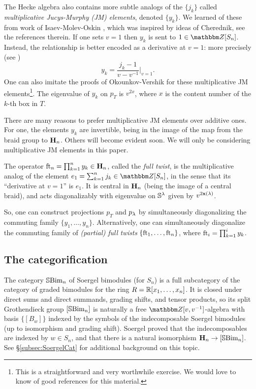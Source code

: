 The Hecke algebra also contains more subtle analogs of the $\{j_k\}$ called \emph{multiplicative Jucys-Murphy (JM) elements}, denoted $\{y_k\}$. We learned of these from work of Isaev-Molev-Oskin \cite{IMO}, which was inspired by ideas of Cherednik, see the references therein. If one sets $v=1$ then $y_k$ is sent to $1 \in \Z[S_n]$. Instead, the relationship is better encoded as a derivative at $v=1$: more precisely (see \cite[p2]{IMO})
\begin{equation} y_k = \frac{j_k - 1}{v - v^{-1}}|_{v = 1}.\end{equation}
One can also imitate the proofs of Okounkov-Vershik \cite{OV96} for these multiplicative JM elements\footnote{This is a straightforward and very worthwhile exercise. We would love to know of good references for this material.}. The eigenvalue of $y_k$ on $p_T$ is $v^{2x}$, where $x$ is the content number of the $k$-th box in $T$.

There are many reasons to prefer multiplicative JM elements over additive ones. For one, the elements $y_k$ are invertible, being in the image of the map from the braid group to ${\mathbf H}_n$. Others will become evident soon. We will only be considering multiplicative JM elements in this paper.

The operator $\operatorname{ft}_n = \prod_{k=1}^n y_k \in {\mathbf H}_n$, called the \emph{full twist}, is the multiplicative analog of the element $e_1 = \sum_{k=1}^n j_k \in \Z[S_n]$, in the sense that its ``derivative at $v=1$'' is $e_1$. It is central in ${\mathbf H}_n$ (being the image of a central braid), and acts diagonalizably with eigenvalue on ${\mathbb{S}}^\lambda$ given by $v^{2\mathbf{x}(\lambda)}$.

So, one can construct projections $p_T$ and $p_\lambda$ by simultaneously diagonalizing the commuting family $\{y_1, \ldots, y_n\}$. Alternatively, one can simultaneously diagonalize the
commuting family of \emph{(partial) full twists} $\{\operatorname{ft}_1, \ldots, \operatorname{ft}_n\}$, where $\operatorname{ft}_i = \prod_{k=1}^i y_k$.

\subsection{The categorification}

The category ${\mathbb{S}}{\rm Bim }_n$ of Soergel bimodules (for $S_n$) is a full subcategory of the category of graded bimodules for the ring $R = {\mathbb{R}}[x_1, \ldots, x_n]$. It is closed under direct sums
and direct summands, grading shifts, and tensor products, so its split Grothendieck group $[{\mathbb{S}}{\rm Bim }_n]$ is naturally a free $\Z[v,v\inv]$-algebra with basis $\{[B_w]\}$ indexed by the
symbols of the indecomposable Soergel bimodules (up to isomorphism and grading shift). Soergel proved that the indecomposables are indexed by $w \in S_n$, and that there is a
natural isomorphism ${\mathbf H}_n \rightarrow [{\mathbb{S}}{\rm Bim }_n]$. See \S\ref{subsec:SoergelCat} for additional background on this topic.

